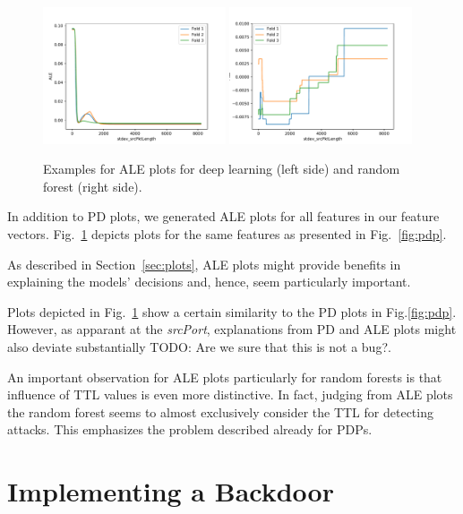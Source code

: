 \documentclass[10pt,sigconf,letterpaper,dvipsnames]{acmart}
\newcommand\note[2]{{\color{#1}#2}}
\newcommand\todo[1]{{\note{red}{TODO: #1}}}
\begin{document}
\begin{figure}[p]
\includegraphics[width=0.48\textwidth]{../ale_CAIA_backdoor_17/apply(stdev(ipTotalLength),forward)_nn.pdf}
\includegraphics[width=0.48\textwidth]{../ale_CAIA_backdoor_17/apply(stdev(ipTotalLength),forward)_rf.pdf}

\caption{Examples for ALE plots for deep learning (left side) and random forest (right side).}
\label{fig:ale}
\end{figure}

In addition to PD plots, we generated ALE plots for all features in our feature vectors. Fig.~\ref{fig:ale} depicts plots for the same features as presented in Fig.~\ref{fig:pdp}.

As described in Section~\ref{sec:plots}, ALE plots might provide benefits in explaining the models' decisions and, hence, seem particularly important.

Plots depicted in Fig.~\ref{fig:ale} show a certain similarity to the PD plots in Fig.\ref{fig:pdp}. However, as apparant at the \textit{srcPort}, explanations from PD and ALE plots might also deviate substantially \todo{Are we sure that this is not a bug?}.

An important observation for ALE plots particularly for random forests is that influence of TTL values is even more distinctive. In fact, judging from ALE plots the random forest seems to almost exclusively consider the TTL for detecting attacks. This emphasizes the problem described already for PDPs.

\section{Implementing a Backdoor}
\end{document}
